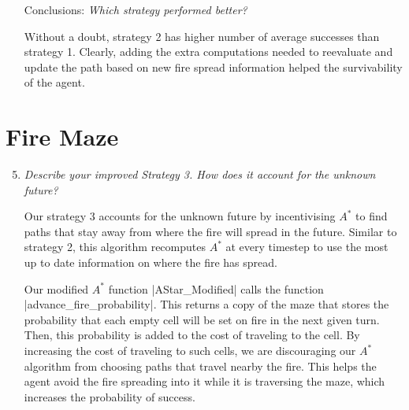 \documentclass[12pt, twoside]{article}
\begin{document}
\begin{itemize}
    \item[Conclusions:]
        \textit{Which strategy performed better?}

        \vspace{4mm}
        Without a doubt, strategy 2 has higher number of average successes than strategy 1. Clearly, adding the extra computations needed to reevaluate and update the path based on new fire spread information helped the survivability of the agent. 


\end{itemize}

\section{Fire Maze}
\begin{enumerate}
    \setcounter{enumi}{4}
    \item 
        \textit{Describe your improved Strategy 3.  How does it account for the unknown future?}
        
        \vspace{4mm}
        Our strategy 3 accounts for the unknown future by incentivising $A^*$ to find paths that stay away from where the fire will spread in the future. Similar to strategy 2, this algorithm recomputes $A^*$ at every timestep to use the most up to date information on where the fire has spread. 
        
        \vspace{4mm}
        Our modified $A^*$ function \cverb|AStar_Modified| calls the function \\ 
        \cverb|advance_fire_probability|. This returns a copy of the maze that stores the probability that each empty cell will be set on fire in the next given turn. Then, this probability is added to the cost of traveling to the cell. By increasing the cost of traveling to such cells, we are discouraging our $A^*$ algorithm from choosing paths that travel nearby the fire. This helps the agent avoid the fire spreading into it while it is traversing the maze, which increases the probability of success.
\end{enumerate}
 
 
\end{document}
